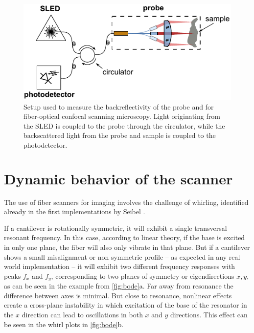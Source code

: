 \begin{itemize}
\end{itemize}

\begin{figure}[h!]\centering \includegraphics[width=12cm]{figures/50_Measurements/conf/setup/confSetup.pdf}
      \caption{Setup used to measure the backreflectivity of the probe and for fiber-optical confocal scanning microscopy. Light originating from the SLED is coupled to the probe through the circulator, while the backscattered light from the probe and sample is coupled to the photodetector.}
      \label{fig:confSetup}
\end{figure}

\section{Dynamic behavior of the scanner}

The use of fiber scanners for imaging involves the challenge of whirling, identified already in the first implementations by Seibel \cite{Seibel2001}.

If a cantilever is rotationally symmetric, it will exhibit a single transversal resonant frequency. In this case, according to linear theory, if the base is excited in only one plane, the fiber will also only vibrate in that plane. But if a cantilever shows a small misalignment or non symmetric profile -- as expected in any real world implementation -- it will exhibit two different frequency responses with peaks $f_x$ and $f_y$, corresponding to two planes of symmetry or eigendirections $x,y$, as can be seen in the example from \autoref{fig:bode}a. Far away from resonance the difference between axes is minimal. But close to resonance, nonlinear effects create a cross-plane instability in which excitation of the base of the resonator in the $x$ direction can lead to oscillations in both $x$ and $y$ directions. This effect can be seen in the whirl plots in  \autoref{fig:bode}b. 

